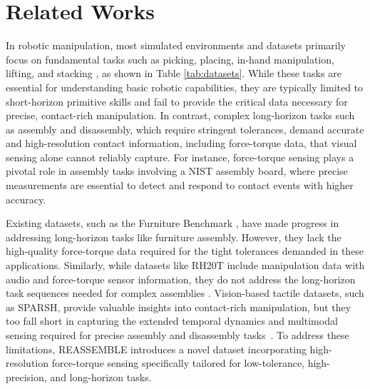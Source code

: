 \section{Related Works}
In robotic manipulation, most simulated environments and datasets primarily focus on fundamental tasks such as picking, placing, in-hand manipulation, lifting, and stacking \cite{rtx, droid,shafiullah2023bringing,walke2023bridgedata}, as shown in Table \ref{tab:datasets}. While these tasks are essential for understanding basic robotic capabilities, they are typically limited to short-horizon primitive skills and fail to provide the critical data necessary for precise, contact-rich manipulation. In contrast, complex long-horizon tasks such as assembly and disassembly, which require stringent tolerances, demand accurate and high-resolution contact information, including force-torque data, that visual sensing alone cannot reliably capture. For instance, force-torque sensing plays a pivotal role in assembly tasks involving a NIST assembly board, where precise measurements are essential to detect and respond to contact events with higher accuracy.

Existing datasets, such as the Furniture Benchmark \cite{heo2023furniturebench}, have made progress in addressing long-horizon tasks like furniture assembly. However, they lack the high-quality force-torque data required for the tight tolerances demanded in these applications. Similarly, while datasets like RH20T include manipulation data with audio and force-torque sensor information, they do not address the long-horizon task sequences needed for complex assemblies \cite{fang2024rh20t}. Vision-based tactile datasets, such as SPARSH, provide valuable insights into contact-rich manipulation, but they too fall short in capturing the extended temporal dynamics and multimodal sensing required for precise assembly and disassembly tasks~\cite{higuera2024sparsh}. To address these limitations, REASSEMBLE introduces a novel dataset incorporating high-resolution force-torque sensing specifically tailored for low-tolerance, high-precision, and long-horizon tasks.

